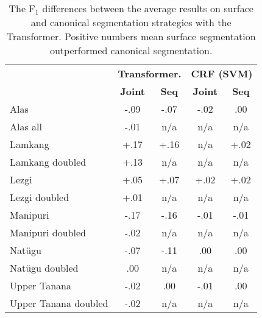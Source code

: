 \begin{table}[!tb]
    \centering
    \begin{tabular}{l|c|c|c|c}
          & \multicolumn{2}{c|}{\textbf{Transformer.}} & \multicolumn{2}{c}{\textbf{CRF (SVM)}} \\
          & \textbf{Joint} & \textbf{Seq} & \textbf{Joint} & \textbf{Seq} \\
         \hline
         Alas  & -.09 &  -.07 & -.02 & .00 \\
         Alas all & -.01 & n/a & n/a & n/a \\
         \hline
         Lamkang  & +.17 & +.16 & n/a & +.02 \\
         Lamkang doubled & +.13 & n/a & n/a & n/a \\
         \hline
         Lezgi  & +.05 & +.07 & +.02 & +.02 \\
         Lezgi doubled & +.01 & n/a & n/a & n/a \\
         \hline
         Manipuri  & -.17 & -.16 & -.01 & -.01 \\
         Manipuri doubled & -.02 & n/a & n/a & n/a \\
         \hline
         Natügu  & -.07 & -.11 & .00 & .00 \\
         Natügu doubled & .00 & n/a & n/a & n/a \\
         \hline
         Upper Tanana & -.02 & .00 & -.01 & .00 \\
         Upper Tanana doubled & -.02 & n/a & n/a & n/a \\
    \end{tabular}
    \caption[F$_1$-score Differences between Surface and Canonical Segmentation]{The F$_1$ differences between the average results on surface and canonical segmentation strategies with the Transformer. Positive numbers mean surface segmentation outperformed canonical segmentation.}
    \label{tab:segdiffresults}
\end{table}


